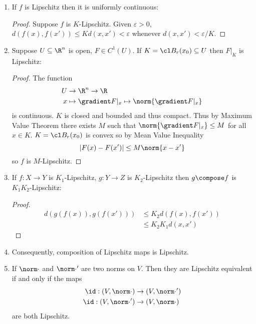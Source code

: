 \documentclass[a4paper]{article}
\theoremstyle{definition}
\begin{document}
\begin{eg}\leavevmode
  \begin{enumerate}
  \item If \(f\) is Lipschitz then it is uniformly continuous:

    \begin{proof}
      Suppose \(f\) is \(K\)-Lipschitz. Given \(\varepsilon > 0\), \(d(f(x), f(x')) \leq K d(x, x') < \varepsilon\) whenever \(d(x, x') < \varepsilon/K\).
    \end{proof}
  \item Suppose \(U \subseteq \R^n\) is open, \(F \in C^1(U)\). If \(K = \cl B_r(x_0) \subseteq U\) then \(F|_K\) is Lipschitz:

    \begin{proof}
      The function
      \begin{align*}
        U & \to \R^n \to \R \\
        x &\mapsto \gradient F|_x \mapsto \norm{\gradient F|_x}
      \end{align*}
      is continuous. \(K\) is closed and bounded and thus compact. Thus by Maximum Value Theorem there exists \(M\) such that \(\norm{\gradient F|_x} \leq M\) for all \(x \in K\). \(K = \cl B_r(x_0)\) is convex so by Mean Value Inequality
      \[
        |F(x) - F(x')| \leq M \norm{x - x'}
      \]
      so \(f\) is \(M\)-Lipschitz.
    \end{proof}
  \item If \(f: X \to Y\) is \(K_1\)-Lipschitz, \(g: Y \to Z\) is \(K_2\)-Lipschitz then \(g \compose f\) is \(K_1K_2\)-Lipschitz:

    \begin{proof}
      \begin{align*}
        d(g(f(x)), g(f(x'))) &\leq K_2 d(f(x), f(x')) \\
                            &\leq K_2K_1 d(x, x')
      \end{align*}
    \end{proof}
  \item Consequently, composition of Lipschitz maps is Lipschitz.
  \item If \(\norm \cdot\) and \(\norm \cdot'\) are two norms on \(V\). Then they are Lipschitz equivalent if and only if the maps
    \begin{align*}
      \id: (V, \norm \cdot) &\to (V, \norm \cdot') \\
      \id: (V, \norm \cdot') &\to (V, \norm \cdot)
    \end{align*}
    are both Lipschitz.
  \end{enumerate}
\end{eg}
\end{document}
